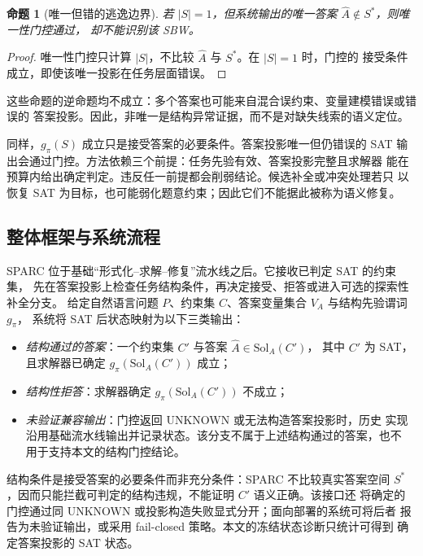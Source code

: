 \documentclass[letterpaper]{article}
\newcommand{\method}{SPARC}
\newcommand{\sbw}{SBW}
\newcommand{\AnsSol}{\mathrm{Sol}_{A}}
\newtheorem{proposition}{命题}
\begin{document}
\begin{proposition}[唯一但错的逃逸边界]
\label{prop:unique-wrong}
若 $|S|=1$，但系统输出的唯一答案 $\hat A\notin S^{*}$，则唯一性门控通过，
却不能识别该 \sbw{}。
\end{proposition}
\begin{proof}
唯一性门控只计算 $|S|$，不比较 $\hat A$ 与 $S^{*}$。在 $|S|=1$ 时，门控的
接受条件成立，即使该唯一投影在任务层面错误。
\end{proof}

这些命题的逆命题均不成立：多个答案也可能来自混合误约束、变量建模错误或错误的
答案投影。因此，非唯一是结构异常证据，而不是对缺失线索的语义定位。

同样，$g_{\pi}(S)$ 成立只是接受答案的必要条件。答案投影唯一但仍错误的
SAT 输出会通过门控。方法依赖三个前提：任务先验有效、答案投影完整且求解器
能在预算内给出确定判定。违反任一前提都会削弱结论。候选补全或冲突处理若只
以恢复 SAT 为目标，也可能弱化题意约束；因此它们不能据此被称为语义修复。

\subsection{整体框架与系统流程}
\label{sec:method-setup}

\method{} 位于基础“形式化--求解--修复”流水线之后。它接收已判定 SAT 的约束集，
先在答案投影上检查任务结构条件，再决定接受、拒答或进入可选的探索性补全分支。
给定自然语言问题 $P$、约束集 $C$、答案变量集合 $V_A$ 与结构先验谓词 $g_{\pi}$，
系统将 SAT 后状态映射为以下三类输出：
\begin{itemize}
  \item \emph{结构通过的答案}：一个约束集 $C'$ 与答案 $\hat A\in\AnsSol(C')$，
        其中 $C'$ 为 SAT，且求解器已确定 $g_{\pi}(\AnsSol(C'))$ 成立；
  \item \emph{结构性拒答}：求解器确定 $g_{\pi}(\AnsSol(C'))$ 不成立；
  \item \emph{未验证兼容输出}：门控返回 UNKNOWN 或无法构造答案投影时，历史
        实现沿用基础流水线输出并记录状态。该分支不属于上述结构通过的答案，也不
        用于支持本文的结构门控结论。
\end{itemize}

结构条件是接受答案的必要条件而非充分条件：\method{} 不比较真实答案空间
$S^{*}$，因而只能拦截可判定的结构违规，不能证明 $C'$ 语义正确。该接口还
将确定的门控通过同 UNKNOWN 或投影构造失败显式分开；面向部署的系统可将后者
报告为未验证输出，或采用 fail-closed 策略。本文的冻结状态诊断只统计可得到
确定答案投影的 SAT 状态。
\end{document}
